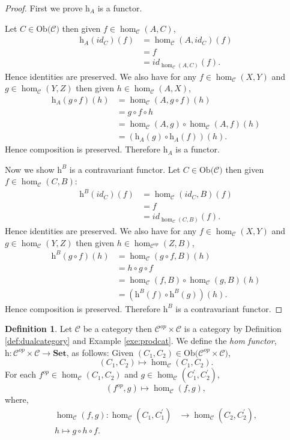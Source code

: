 \documentclass[11pt,a4paper]{article}
\theoremstyle{definition}
\newtheorem{definition}[thm]{Definition}
\newcommand\ho[3][]{\hom_{#1}(#2,#3)}
\newcommand\ob[1]{\mathrm{Ob(}#1\mathrm{)}}
\newcommand\cat[1]{\mathscr{#1}}
\newcommand\func[3]{\mathrm{#1}\colon#2\rightarrow#3}
\numberwithin{equation}{section}
\begin{document}
\begin{proof}
First we prove $\mathrm{h}_{A}$ is a functor.

    Let $C\in\ob{\cat{C}}$ then given $f\in\ho[\cat{C}]{A}{C}$,
    \begin{align*}
        \mathrm{h}_{A}(id_{C})(f) &= \ho[\cat{C}]{A}{id_{C}}(f)\\
        &= f \\
        &= id_{\ho[\cat{C}]{A}{C}}(f).
    \end{align*}
Hence identities are preserved. 
We also have for any $f\in\ho[\cat{C}]{X}{Y}$ and $g\in\ho[\cat{C}]{Y}{Z}$ then given $h\in\ho[\cat{C}]{A}{X}$,
\begin{align*}
    \mathrm{h}_{A}(g\circ f)(h) &= \ho[\cat{C}]{A}{g\circ f}(h)\\
    &= g\circ f \circ h\\
    &= \ho[\cat{C}]{A}{g} \circ \ho[\cat{C}]{A}{f}(h)\\
    &= (\mathrm{h}_{A}(g)\circ \mathrm{h}_{A}(f))(h).
\end{align*}
Hence composition is preserved. Therefore $\mathrm{h}_{A}$ is a functor.

Now we show $\mathrm{h}^{B}$ is a contravariant functor.
Let $C\in\ob{\cat{C}}$ then given $f\in\ho[\cat{C}]{C}{B}$:
    \begin{align*}
        \mathrm{h}^{B}(id_{C})(f) &= \ho[\cat{C}]{id_{C}}{B}(f)\\
        &= f \\
        &= id_{\ho[\cat{C}]{C}{B}}(f).
    \end{align*}
Hence identities are preserved. We also have for any $f\in\ho[\cat{C}]{X}{Y}$ and $g\in\ho[\cat{C}]{Y}{Z}$ then given $h\in\ho[\cat{C}^{op}]{Z}{B}$,
\begin{align*}
    \mathrm{h}^{B}(g\circ f)(h) &= \ho[\cat{C}]{g\circ f}{B}(h)\\
    &= h\circ g\circ f\\
    &= \ho[\cat{C}]{f}{B} \circ \ho[\cat{C}]{g}{B}(h)\\
    &= (\mathrm{h}^{B}(f) \circ \mathrm{h}^{B}(g))(h).
\end{align*}
Hence composition is preserved. Therefore $\mathrm{h}^{B}$ is a contravariant functor.
\end{proof}
\begin{definition}
    \label{def:covarianthomfunc}
    Let $\cat{C}$ be a category then $\cat{C}^{op}\times\cat{C}$ is a category by Definition \ref{def:dualcategory} and Example \ref{exe:prodcat}. We define the \emph{hom functor}, $\func{h}{\cat{C}^{op}\times\cat{C}}{\mathbf{Set}}$, as follows:
    Given $(C_{1},C_{2})\in\ob{\cat{C}^{op}\times\cat{C}}$,
    \[(C_{1},C_{2})\mapsto\ho[\cat{C}]{C_{1}}{C_{2}}.\]
    For each $f^{op}\in\ho[\cat{C}]{C_{1}}{C_{2}}$ and $g\in\ho[\cat{C}]{C_{1}^\prime}{C_{2}^\prime}$,
    \[(f^{op},g)\mapsto\ho[\cat{C}]{f}{g},\]
    where,
    \begin{align*}
        \ho[\cat{C}]{f}{g}\colon\ho[\cat{C}]{C_{1}}{C_{1}^\prime}&\to\ho[\cat{C}]{C_{2}}{C_{2}^\prime},\\
        h\mapsto g\circ h\circ f.
    \end{align*}
\end{definition}
\end{document}
